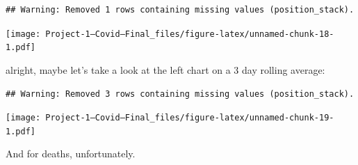\documentclass[
]{article}
\newenvironment{Shaded}{\begin{snugshade}}{\end{snugshade}}
\newcommand{\DataTypeTok}[1]{\textcolor[rgb]{0.13,0.29,0.53}{#1}}
\newcommand{\DecValTok}[1]{\textcolor[rgb]{0.00,0.00,0.81}{#1}}
\newcommand{\FloatTok}[1]{\textcolor[rgb]{0.00,0.00,0.81}{#1}}
\newcommand{\KeywordTok}[1]{\textcolor[rgb]{0.13,0.29,0.53}{\textbf{#1}}}
\newcommand{\NormalTok}[1]{#1}
\newcommand{\OperatorTok}[1]{\textcolor[rgb]{0.81,0.36,0.00}{\textbf{#1}}}
\newcommand{\OtherTok}[1]{\textcolor[rgb]{0.56,0.35,0.01}{#1}}
\newcommand{\StringTok}[1]{\textcolor[rgb]{0.31,0.60,0.02}{#1}}
\begin{document}
\begin{verbatim}
## Warning: Removed 1 rows containing missing values (position_stack).
\end{verbatim}

\texttt{[image: Project-1---Covid---Final\_files/figure-latex/unnamed-chunk-18-1.pdf]}

alright, maybe let's take a look at the left chart on a 3 day rolling
average:

\begin{Shaded}
\end{Shaded}

\begin{verbatim}
## Warning: Removed 3 rows containing missing values (position_stack).
\end{verbatim}

\texttt{[image: Project-1---Covid---Final\_files/figure-latex/unnamed-chunk-19-1.pdf]}

And for deaths, unfortunately.
\end{document}
